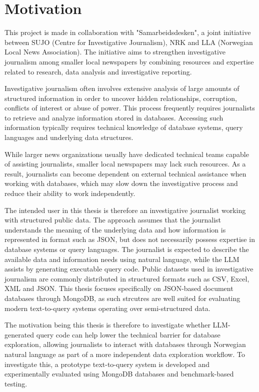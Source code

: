 \section{Motivation}

This project is made in collaboration with "Samarbeidsdesken", a joint initiative between SUJO (Centre for Investigative Journalism), NRK and LLA (Norwegian Local News Association). 
The initiative aims to strengthen investigative journalism among smaller local newspapers by combining resources and expertise related to research, data analysis and investigative reporting.  

Investigative journalism often involves extensive analysis of large amounts of structured information in order to uncover hidden relationships, corruption, conflicts of interest or abuse of power. This process frequently requires journalists to retrieve and analyze information stored in databases. Accessing such information typically requires technical knowledge of database systems, query languages and underlying data structures. 

While larger news organizations usually have dedicated technical teams capable of assisting journalists, smaller local newspapers may lack such resources. As a result, journalists can become dependent on external technical assistance when working with databases, which may slow down the investigative process and reduce their ability to work independently.

The intended user in this thesis is therefore an investigative journalist working with structured public data. The approach assumes that the journalist understands the meaning of the underlying data and how information is represented in format such as JSON, but does not necessarily possess expertise in database systems or query languages. The journalist is expected to describe the available data and information needs using natural language, while the LLM assists by generating executable query code. Public datasets used in investigative journalism are commonly distributed in structured formats such as CSV, Excel, XML and JSON. This thesis focuses specifically on JSON-based document databases through MongoDB, as such strcutres are well suited for evaluating modern text-to-query systems operating over semi-structured data. 

The motivation being this thesis is therefore to investigate whether LLM-generated query code can help lower the technical barrier for database exploration, allowing journalists to interact with databases through Norwegian natural language as part of a more independent data exploration workflow. To investigate this, a prototype text-to-query system is developed and experimentally evaluated using MongoDB databases and benchmark-based testing. 


